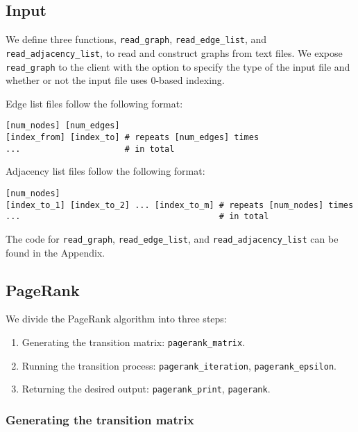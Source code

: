\documentclass[12pt, titlepage, twoside]{amsart}
\begin{document}
\subsection{Input}

We define three functions,
\texttt{read_graph}, \texttt{read_edge_list}, and \texttt{read_adjacency_list},
to read and construct graphs from text files.
We expose \texttt{read_graph} to the client with the option to specify the type of the input file and
whether or not the input file uses 0-based indexing.

Edge list files follow the following format:

\begin{verbatim}
[num_nodes] [num_edges]
[index_from] [index_to] # repeats [num_edges] times
...                     # in total
\end{verbatim}

Adjacency list files follow the following format:

\begin{verbatim}
[num_nodes]
[index_to_1] [index_to_2] ... [index_to_m] # repeats [num_nodes] times
...                                        # in total
\end{verbatim}

The code for
\texttt{read_graph},
\texttt{read_edge_list}, and \texttt{read_adjacency_list} can be found in the
Appendix.

\subsection{PageRank}

We divide the PageRank algorithm into three steps:

\begin{enumerate}
  \item Generating the transition matrix: \texttt{pagerank_matrix}.
  \item Running the transition process: \texttt{pagerank_iteration}, \texttt{pagerank_epsilon}.
  \item Returning the desired output: \texttt{pagerank_print}, \texttt{pagerank}.
\end{enumerate}

\subsubsection{Generating the transition matrix}
\end{document}
